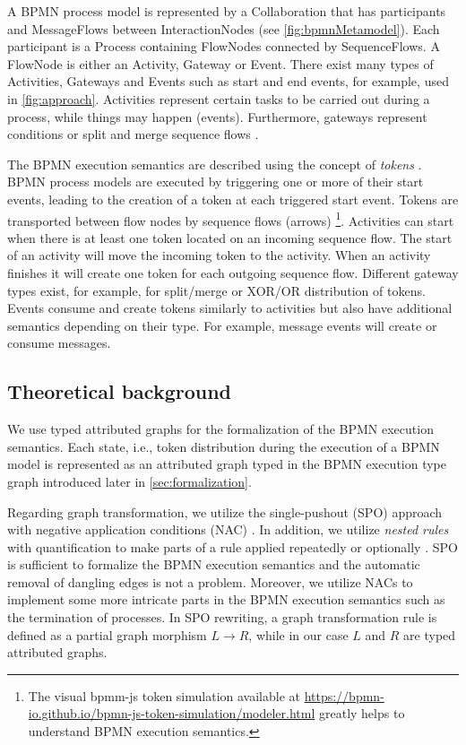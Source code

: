 \documentclass[submission, copyright, creativecommons]{eptcs}
\begin{document}
A BPMN process model is represented by a \textsf{Collaboration} that has \textsf{participants} and \textsf{MessageFlows} between \textsf{InteractionNodes} (see  \cref{fig:bpmnMetamodel}).
Each participant is a \textsf{Process} containing \textsf{FlowNodes} connected by \textsf{SequenceFlows}.
A \textsf{FlowNode} is either an \textsf{Activity}, \textsf{Gateway} or \textsf{Event}.
There exist many types of \textsf{Activities}, \textsf{Gateways} and \textsf{Events} such as start and end events, for example, used in \cref{fig:approach}.
Activities represent certain tasks to be carried out during a process, while things may happen (events).
Furthermore, gateways represent conditions or split and merge sequence flows \cite{freundRealLifeBPMNUsing2019}.

The BPMN execution semantics are described using the concept of \emph{tokens} \cite{objectmanagementgroupBusinessProcessModel2013}.
BPMN process models are executed by triggering one or more of their start events, leading to the creation of a token at each triggered start event.
Tokens are transported between flow nodes by sequence flows (arrows)
\footnote{The visual bpmm-js token simulation available at \url{https://bpmn-io.github.io/bpmn-js-token-simulation/modeler.html} greatly helps to understand BPMN execution semantics.}.
Activities can start when there is at least one token located on an incoming sequence flow.
The start of an activity will move the incoming token to the activity.
When an activity finishes it will create one token for each outgoing sequence flow.
Different gateway types exist, for example, for split/merge or XOR/OR distribution of tokens.
Events consume and create tokens similarly to activities but also have additional semantics depending on their type.
For example, message events will create or consume messages.

\subsection{Theoretical background}
We use typed attributed graphs for the formalization of the BPMN execution semantics.
Each state, i.e., token distribution during the execution of a BPMN model is represented as an attributed graph typed in the BPMN execution type graph introduced later in \cref{sec:formalization}.

Regarding graph transformation, we utilize the single-pushout (SPO) approach with negative application conditions (NAC) \cite{ehrigALGEBRAICAPPROACHESGRAPH1997}.
In addition, we utilize \emph{nested rules} with quantification to make parts of a rule applied repeatedly or optionally \cite{rensinkNestedQuantificationGraph2006,rensinkHowMuchAre2017}.
SPO is sufficient to formalize the BPMN execution semantics and the automatic removal of dangling edges is not a problem.
Moreover, we utilize NACs to implement some more intricate parts in the BPMN execution semantics such as the termination of processes. 
In SPO rewriting, a graph transformation rule is defined as a partial graph morphism $L \to R$, while in our case $L$ and $R$ are typed attributed graphs. 
\end{document}
